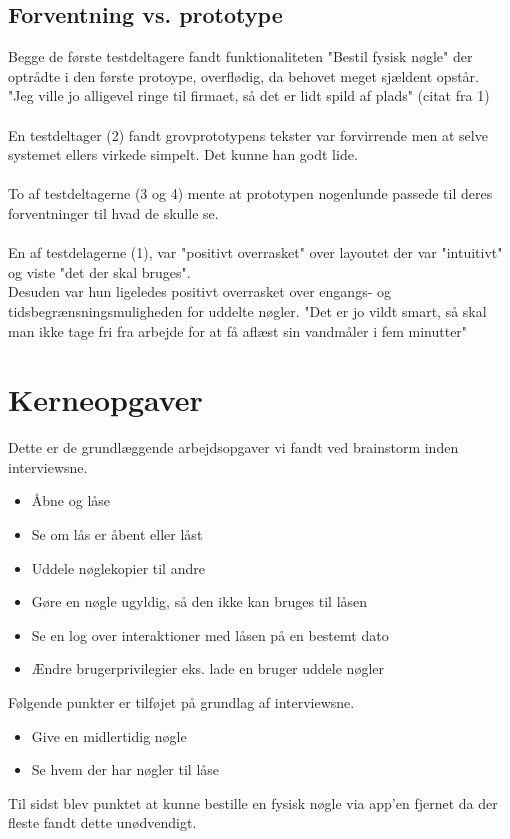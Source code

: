 \documentclass[a4paper,12pt]{article}
\begin{document}
\subsection{Forventning vs. prototype}
Begge de første testdeltagere fandt funktionaliteten "Bestil fysisk nøgle" der optrådte i den første protoype, overflødig, da behovet meget sjældent opstår. \\"Jeg ville jo alligevel ringe til firmaet, så det er lidt spild af plads" (citat fra 1)
\\ \\
En testdeltager (2) fandt grovprototypens tekster var forvirrende men at selve systemet ellers virkede simpelt. Det kunne han godt lide.
\\ \\
To af testdeltagerne (3 og 4) mente at prototypen nogenlunde passede til deres forventninger til hvad de skulle se.
\\ \\
En af testdelagerne (1), var "positivt overrasket" over layoutet der var "intuitivt" og viste "det der skal bruges". \\ 
Desuden var hun ligeledes positivt overrasket over engangs- og tidsbegrænsningsmuligheden for uddelte nøgler. "Det er jo vildt smart, så skal man ikke tage fri fra arbejde for at få aflæst sin vandmåler i fem minutter"


\section{Kerneopgaver}
Dette er de grundlæggende arbejdsopgaver vi fandt ved brainstorm inden interviewsne.

\begin{itemize}
    \item Åbne og låse
    \item Se om lås er åbent eller låst
    \item Uddele nøglekopier til andre
    \item Gøre en nøgle ugyldig, så den ikke kan bruges til låsen
    \item Se en log over interaktioner med låsen på en bestemt dato
    \item Ændre brugerprivilegier eks. lade en bruger uddele nøgler
\end{itemize}
Følgende punkter er tilføjet på grundlag af interviewsne.

\begin{itemize}
    \item Give en midlertidig nøgle
    \item Se hvem der har nøgler til låse
\end{itemize}
Til sidst blev punktet at kunne bestille en fysisk nøgle via app'en fjernet da der fleste fandt dette unødvendigt.
\end{document}
